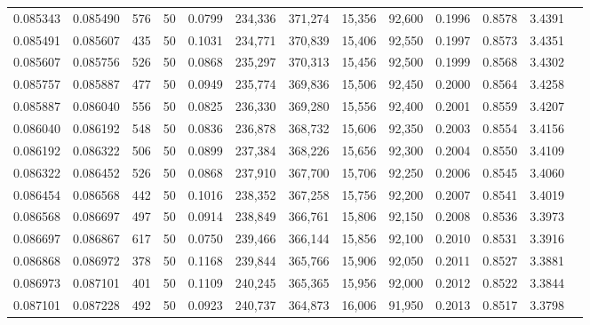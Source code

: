 \begin{tabular}{rrrrrrrrrrrrr}
0.085343 & 0.085490 &   576 &  50 &                                     0.0799 & 234,336 & 371,274 &  15,356 &  92,600 & 0.1996 & 0.8578 & 3.4391 \\
0.085491 & 0.085607 &   435 &  50 &                                     0.1031 & 234,771 & 370,839 &  15,406 &  92,550 & 0.1997 & 0.8573 & 3.4351 \\
0.085607 & 0.085756 &   526 &  50 &                                     0.0868 & 235,297 & 370,313 &  15,456 &  92,500 & 0.1999 & 0.8568 & 3.4302 \\
0.085757 & 0.085887 &   477 &  50 &                                     0.0949 & 235,774 & 369,836 &  15,506 &  92,450 & 0.2000 & 0.8564 & 3.4258 \\
0.085887 & 0.086040 &   556 &  50 &                                     0.0825 & 236,330 & 369,280 &  15,556 &  92,400 & 0.2001 & 0.8559 & 3.4207 \\
0.086040 & 0.086192 &   548 &  50 &                                     0.0836 & 236,878 & 368,732 &  15,606 &  92,350 & 0.2003 & 0.8554 & 3.4156 \\
0.086192 & 0.086322 &   506 &  50 &                                     0.0899 & 237,384 & 368,226 &  15,656 &  92,300 & 0.2004 & 0.8550 & 3.4109 \\
0.086322 & 0.086452 &   526 &  50 &                                     0.0868 & 237,910 & 367,700 &  15,706 &  92,250 & 0.2006 & 0.8545 & 3.4060 \\
0.086454 & 0.086568 &   442 &  50 &                                     0.1016 & 238,352 & 367,258 &  15,756 &  92,200 & 0.2007 & 0.8541 & 3.4019 \\
0.086568 & 0.086697 &   497 &  50 &                                     0.0914 & 238,849 & 366,761 &  15,806 &  92,150 & 0.2008 & 0.8536 & 3.3973 \\
0.086697 & 0.086867 &   617 &  50 &                                     0.0750 & 239,466 & 366,144 &  15,856 &  92,100 & 0.2010 & 0.8531 & 3.3916 \\
0.086868 & 0.086972 &   378 &  50 &                                     0.1168 & 239,844 & 365,766 &  15,906 &  92,050 & 0.2011 & 0.8527 & 3.3881 \\
0.086973 & 0.087101 &   401 &  50 &                                     0.1109 & 240,245 & 365,365 &  15,956 &  92,000 & 0.2012 & 0.8522 & 3.3844 \\
0.087101 & 0.087228 &   492 &  50 &                                     0.0923 & 240,737 & 364,873 &  16,006 &  91,950 & 0.2013 & 0.8517 & 3.3798 \\

\end{tabular}
